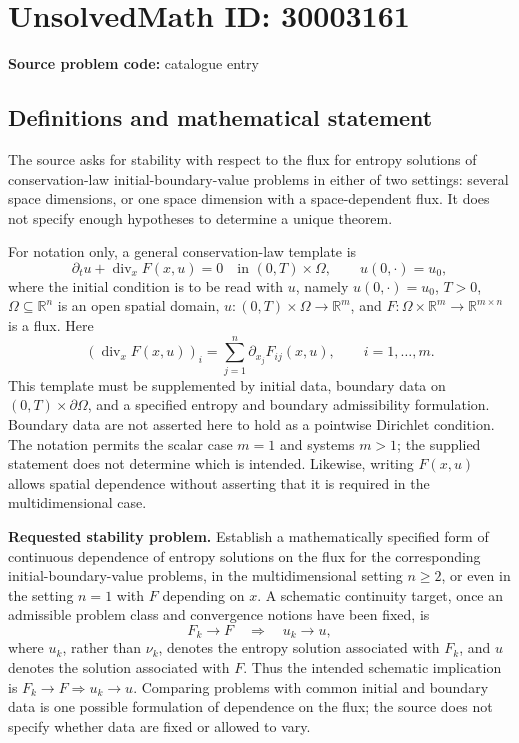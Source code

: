 \documentclass[11pt]{article}
\newcommand{\R}{\mathbb{R}}
\begin{document}
\section*{UnsolvedMath ID: 30003161}
\textbf{Source problem code:} catalogue entry
\subsection{Definitions and mathematical statement}
The source asks for stability with respect to the flux for entropy solutions of conservation-law initial-boundary-value problems in either of two settings: several space dimensions, or one space dimension with a space-dependent flux. It does not specify enough hypotheses to determine a unique theorem.

For notation only, a general conservation-law template is
\[
\partial_t u+\operatorname{div}_x F(x,u)=0
\quad\text{in }(0,T)\times\Omega,
\qquad
u(0,\cdot)=u_0,
\]
where the initial condition is to be read with \(u\), namely \(u(0,\cdot)=u_0\), \(T>0\), \(\Omega\subseteq\R^n\) is an open spatial domain, \(u:(0,T)\times\Omega\to\R^m\), and \(F:\Omega\times\R^m\to\R^{m\times n}\) is a flux. Here
\[
(\operatorname{div}_x F(x,u))_i
=\sum_{j=1}^{n}\partial_{x_j}F_{ij}(x,u),
\qquad i=1,\ldots,m.
\]
This template must be supplemented by initial data, boundary data on \((0,T)\times\partial\Omega\), and a specified entropy and boundary admissibility formulation. Boundary data are not asserted here to hold as a pointwise Dirichlet condition. The notation permits the scalar case \(m=1\) and systems \(m>1\); the supplied statement does not determine which is intended. Likewise, writing \(F(x,u)\) allows spatial dependence without asserting that it is required in the multidimensional case.

\textbf{Requested stability problem.} Establish a mathematically specified form of continuous dependence of entropy solutions on the flux for the corresponding initial-boundary-value problems, in the multidimensional setting \(n\geq2\), or even in the setting \(n=1\) with \(F\) depending on \(x\). A schematic continuity target, once an admissible problem class and convergence notions have been fixed, is
\[
F_k\longrightarrow F
\quad\Longrightarrow\quad
u_k\longrightarrow u,
\]
where \(u_k\), rather than \(\nu_k\), denotes the entropy solution associated with \(F_k\), and \(u\) denotes the solution associated with \(F\). Thus the intended schematic implication is \(F_k\to F\Longrightarrow u_k\to u\). Comparing problems with common initial and boundary data is one possible formulation of dependence on the flux; the source does not specify whether data are fixed or allowed to vary.
\end{document}
